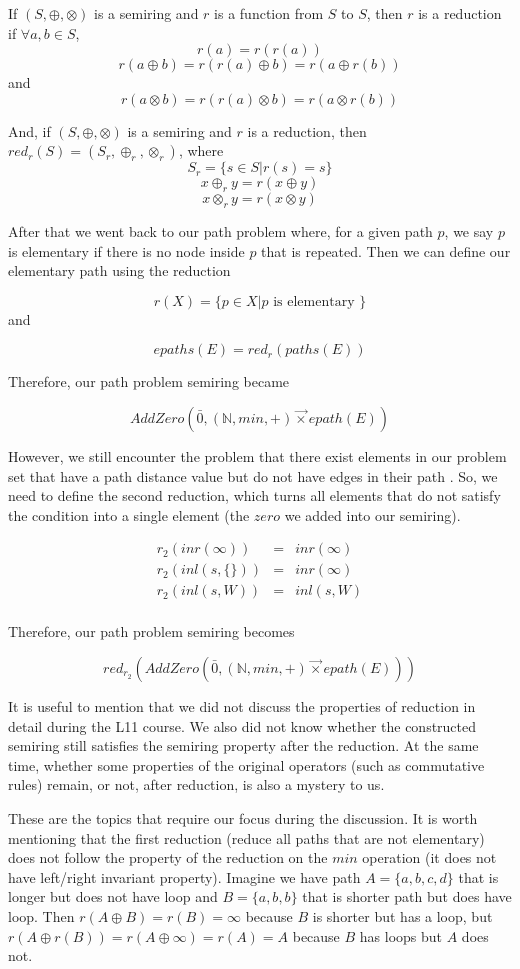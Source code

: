 \documentclass[a4paper,12pt,twoside,openright]{report}
\newcommand{\e}[2]{
\begin{equation}
  \label{#1} 
  #2
\end{equation}
}
\begin{document}
If $(S,\oplus,\otimes)$ is a semiring and $r$ is a function from $S$ to $S$, then $r$ is a reduction if $\forall a,b \in S$, 
\[r(a) = r(r(a))\]
\[r(a\oplus b) = r(r(a)\oplus b) = r(a\oplus r(b))\] and 
\[r(a\otimes b) = r(r(a)\otimes b) = r(a\otimes r(b))\]

And, if $(S,\oplus,\otimes)$ is a semiring and $r$ is a reduction, then $red_r(S) = (S_r,\oplus_r,\otimes_r)$, where 
\[S_r = \{s\in S|r(s)= s\}\]
\[x\oplus_r y = r(x\oplus y)\]
\[x\otimes_r y = r(x\otimes y)\]

After that we went back to our path problem where, for a given path $p$, we say $p$ is elementary if there is no node inside $p$ that is repeated. Then we can define our elementary path using the reduction 
\e{r:def:elementary}{r(X) = \{p\in X | p \mbox{ is elementary }\}}and 
\e{r:def:elementary_path}{epaths(E) = red_r(paths(E))}

Therefore, our path problem semiring became 
\e{r:def:path_problem}{AddZero(\bar0,(\mathbb{N},min,+) \overrightarrow{\times} epath(E))}

However, we still encounter the problem that there exist elements in our problem set that have a path distance value but do not have edges in their path . So, we need to define the second reduction, which turns all elements that do not satisfy the condition into a single element (the $zero$ we added into our semiring).
\e{r:def:reduction_annihilator}{
\begin{array}{rcl} 
r_2 (inr(\infty)) & = & inr(\infty) \\
r_2 (inl(s,\{\})) & = & inr(\infty) \\
r_2 (inl(s,W)) & = & inl(s,W) \\
\end{array}}
Therefore, our path problem semiring becomes 
\e{r:def:reduced_path_problem}{red_{r_2}(AddZero(\bar0,(\mathbb{N},min,+) \overrightarrow{\times} epath(E)))}

It is useful to mention that we did not discuss the properties of reduction in detail during the L11 course. We also did not know whether the constructed semiring still satisfies the semiring property after the reduction. At the same time, whether some properties of the original operators (such as commutative rules) remain, or not, after reduction, is also a mystery to us.

These are the topics that require our focus during the discussion.
It is worth mentioning that the first reduction (reduce all paths that are not elementary) does not follow the property of the reduction on the $min$ operation (it does not have left/right invariant property). Imagine we have path $A = \{a,b,c,d\}$ that is longer but does not have loop and $B = \{a,b,b\}$ that is shorter path but does have loop. Then $r(A\oplus B) = r(B) = \infty$ because $B$ is shorter but has a loop, but $r(A\oplus r(B)) = r(A \oplus \infty) = r(A) = A$ because $B$ has loops but $A$ does not.
\end{document}
